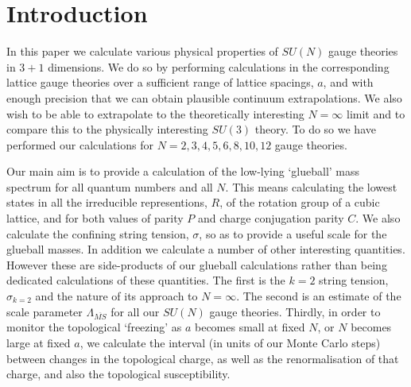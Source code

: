 \documentclass[12pt]{article}
\begin{document}
%
%
%
%
\section{Introduction}
\label{section_intro}

In this paper we calculate various physical properties of $SU(N)$ 
gauge theories in $3+1$ dimensions. We do so by performing calculations 
in the corresponding lattice gauge theories over a sufficient range of lattice
spacings, $a$, and with enough precision that we can obtain plausible
continuum extrapolations. We also wish to be able to extrapolate to the
theoretically interesting $N=\infty$ limit and to compare this to the
physically interesting $SU(3)$ theory. To do so we have performed
our calculations for $N=2,3,4,5,6,8,10,12$ gauge theories. 

Our main aim is to provide a calculation of the low-lying `glueball' mass spectrum
for all quantum numbers and all $N$. This means calculating the lowest states in all 
the irreducible representions, $R$, of the rotation group of a cubic lattice, and for
both values of parity $P$ and charge conjugation parity $C$. We also calculate the
confining string tension, $\sigma$, so as to provide a useful scale for the glueball
masses. In addition we calculate a number of other interesting quantities.
However these are side-products of our glueball calculations rather than being
dedicated calculations of these quantities. The first is the $k=2$ string tension, 
$\sigma_{k=2}$ and the nature of its approach to $N=\infty$. The second is an estimate 
of the scale parameter $\Lambda_{\overline{MS}}$ for all our $SU(N)$ gauge theories. 
Thirdly, in order to monitor the topological `freezing' as $a$ becomes small
at fixed $N$, or $N$ becomes large at fixed $a$, we calculate the interval (in units
of our Monte Carlo steps) between changes in the topological charge, as well
as the renormalisation of that charge, and also the topological susceptibility.
\end{document}
